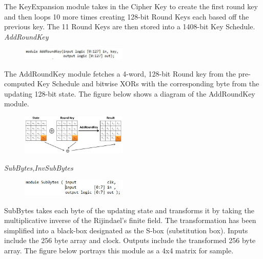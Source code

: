 \documentclass[journal, twocolumn, final,11pt,letterpaper]{IEEEtran}
\begin{document}
The KeyExpansion module takes in the Cipher Key to create the first round key and then loops 10 more times creating 128-bit Round Keys each based off the previous key.  The 11 Round Keys are then stored into a 1408-bit Key Schedule. \\  

\textit{AddRoundKey}\\
\vspace{-4mm}

\begin{figure}[h]
	\centering
	\includegraphics[width=0.45\textwidth]{AddRoundKey.jpg}
	\label{fig:AddRoundKey}
\end{figure}

The AddRoundKey module fetches a 4-word, 128-bit Round key from the pre-computed Key Schedule and bitwise XORs with the corresponding byte from the updating 128-bit state. The figure below shows a diagram of the AddRoundKey module. \\

\begin{figure}[h]
	\centering
	\includegraphics[width=0.45\textwidth]{AddRoundKeydia.jpg}
\end{figure}  


\textit{SubBytes,InvSubBytes}\\
\vspace{-4mm}

\begin{figure}[h]
	\centering
	\includegraphics[width=0.45\textwidth]{SubBytes.jpg}
	\label{fig:SubBytes}
\end{figure}

SubBytes takes each byte of the updating state and transforms it by taking the multiplicative inverse of the Rijindael's finite field.  The transformation has been simplified into a black-box designated as the S-box (substitution box).  Inputs include the 256 byte array and clock.  Outputs include the transformed 256 byte array. The figure below portrays this module as a 4x4 matrix for sample.  \\
\end{document}
